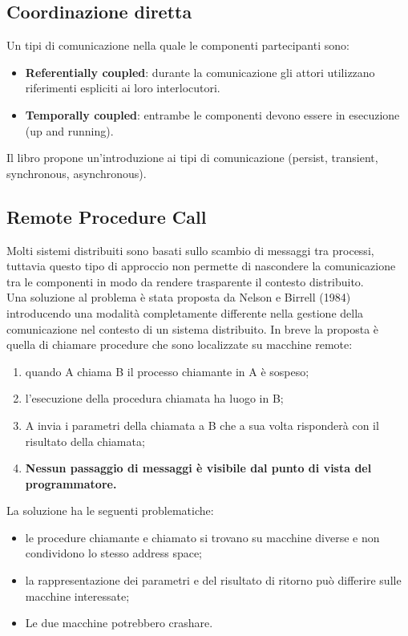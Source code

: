 \documentclass[12pt]{article}
\begin{document}
	\subsection{Coordinazione diretta}	
		Un tipi di comunicazione nella quale le componenti partecipanti sono:
		\begin{itemize}
			\item \textbf{Referentially coupled}: durante la comunicazione gli attori utilizzano riferimenti espliciti ai loro interlocutori.
			\item \textbf{Temporally coupled}: entrambe le componenti devono essere in esecuzione (up and running).	
		\end{itemize}
		Il libro propone un'introduzione ai tipi di comunicazione (persist, transient, synchronous, asynchronous).
		
	\subsection{Remote Procedure Call}
		Molti sistemi distribuiti sono basati sullo scambio di messaggi tra processi, tuttavia questo tipo di approccio non permette di nascondere la comunicazione tra le componenti in modo da rendere trasparente il contesto distribuito. \\
		Una soluzione al problema è stata proposta da Nelson e Birrell (1984) introducendo una modalità completamente differente nella gestione della comunicazione nel contesto di un sistema distribuito.
		In breve la proposta è quella di chiamare procedure che sono localizzate su macchine remote:
		\begin{enumerate}
			\item quando A chiama B il processo chiamante in A è sospeso;
			\item l'esecuzione della procedura chiamata ha luogo in B;
			\item A invia i parametri della chiamata a B che a sua volta risponderà con il risultato della chiamata;
			\item \textbf{Nessun passaggio di messaggi è visibile dal punto di vista del programmatore.}
		\end{enumerate}
		La soluzione ha le seguenti problematiche:
		\begin{itemize}
			\item le procedure chiamante e chiamato si trovano su macchine diverse e non condividono lo stesso address space;
			\item la rappresentazione dei parametri e del risultato di ritorno può differire sulle macchine interessate;
			\item Le due macchine potrebbero crashare.
		\end{itemize}
\end{document}
